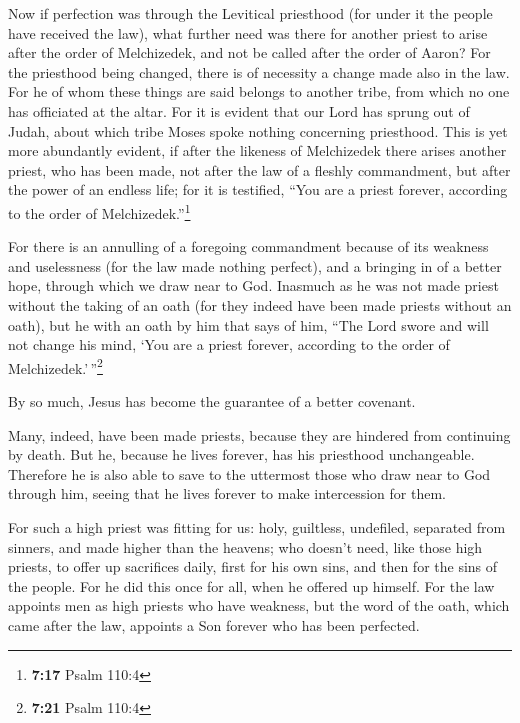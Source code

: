  Now if perfection was through the Levitical priesthood
(for under it the people have received the law), what further need was
there for another priest to arise after the order of Melchizedek, and
not be called after the order of Aaron?  For the
priesthood being changed, there is of necessity a change made also in
the law.  For he of whom these things are said belongs to
another tribe, from which no one has officiated at the altar.
 For it is evident that our Lord has sprung out of Judah,
about which tribe Moses spoke nothing concerning priesthood.
 This is yet more abundantly evident, if after the
likeness of Melchizedek there arises another priest,  who
has been made, not after the law of a fleshly commandment, but after the
power of an endless life;  for it is testified, ``You are
a priest forever, according to the order of Melchizedek.''\footnote{\textbf{7:17}
  Psalm 110:4}

 For there is an annulling of a foregoing commandment
because of its weakness and uselessness  (for the law
made nothing perfect), and a bringing in of a better hope, through which
we draw near to God.  Inasmuch as he was not made priest
without the taking of an oath  (for they indeed have been
made priests without an oath), but he with an oath by him that says of
him, ``The Lord swore and will not change his mind, `You are a priest
forever, according to the order of Melchizedek.'\,''\footnote{\textbf{7:21}
  Psalm 110:4}

 By so much, Jesus has become the guarantee of a better
covenant.

 Many, indeed, have been made priests, because they are
hindered from continuing by death.  But he, because he
lives forever, has his priesthood unchangeable. 
Therefore he is also able to save to the uttermost those who draw near
to God through him, seeing that he lives forever to make intercession
for them.

 For such a high priest was fitting for us: holy,
guiltless, undefiled, separated from sinners, and made higher than the
heavens;  who doesn't need, like those high priests, to
offer up sacrifices daily, first for his own sins, and then for the sins
of the people. For he did this once for all, when he offered up himself.
 For the law appoints men as high priests who have
weakness, but the word of the oath, which came after the law, appoints a
Son forever who has been perfected.

